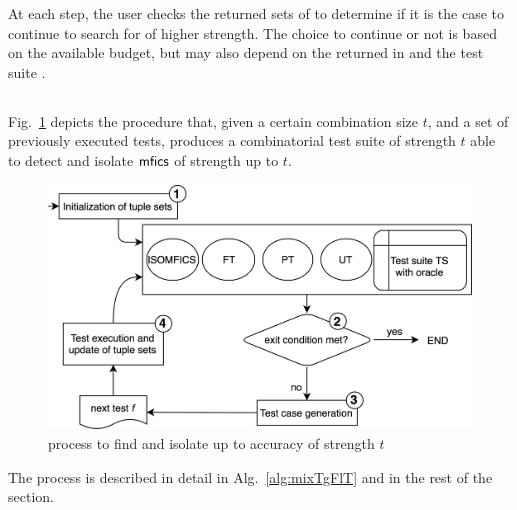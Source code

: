 \begin{tikzborder}{\cite{Gargantini16:validation}}
\begin{tikzborder}{\cite{gargantini_combinatorial_2017}}
\begin{tikzborder}{\cite{gargantini_combinatorial_2017}}
\begin{tikzborder}{\cite{garn2019}}
\begin{tikzborder}{\cite{arcaini2019achieving}}
\begin{tikzborder}{}
At each step, the user checks the returned sets of \isoMficsSet to determine if it is the case to continue to search for \mfics of higher strength. The choice to continue or not is based on the available budget, but may also depend on the returned \mfics in \isoMficsSet and the test suite \ts.


\end{tikzborder}
\subsection{\mixt}
\begin{tikzborder}{}	

Fig.~\ref{fig:mixTgFlT} depicts the procedure \mixt that, given a certain combination size $t$, and a set of previously executed tests, produces a combinatorial test suite of strength $t$ able to detect and isolate $\textsf{mfics}$ of strength up to $t$.
%
\begin{figure}[!htb]
	\centering
	\includegraphics[width=1\columnwidth]{images/process_mix_fl_tg2}
	\caption{\mixt process to find and isolate \mfics up to accuracy of strength $t$}
	\label{fig:mixTgFlT}
\end{figure}
%
The process is described in detail in Alg.~\ref{alg:mixTgFlT} and in the rest of the section.
%
\begin{algorithm}[!htb]
	\begin{algorithmic}[1]
		\label{line:initPT}
		\label{line:initFT}

\end{algorithmic}
\end{algorithm}
\end{tikzborder}
\end{tikzborder}
\end{tikzborder}
\end{tikzborder}
\end{tikzborder}
\end{tikzborder}
